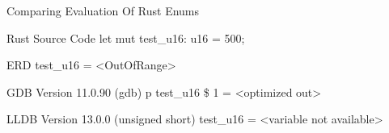 
\begin{frame}{Comparing Evaluation Of Rust Enums}
	\begin{alertblock}{Rust Source Code}
		let mut test\_u16: u16 = 500;
    	\end{alertblock}

	\begin{block}{ERD}
		test\_u16 = \textless OutOfRange\textgreater
    	\end{block}

    	\begin{block}{GDB Version 11.0.90}
		(gdb) p test\_u16\newline
		\$ 1 = \textless optimized out\textgreater
    	\end{block}

    	\begin{block}{LLDB Version 13.0.0}
		(unsigned short) test\_u16 = \textless variable not available\textgreater
    	\end{block}
\end{frame}


